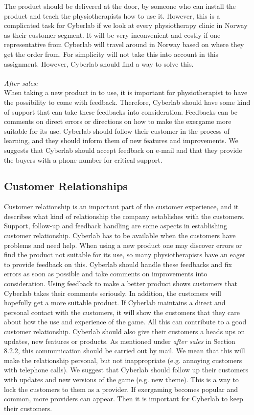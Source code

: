 The product should be delivered at the door, by someone who can install the product and teach the physiotherapists how to use it. However, this is a complicated task for Cyberlab if we look at every physiotherapy clinic in Norway as their customer segment. It will be very inconvenient and costly if  one representative from Cyberlab will travel around in Norway based on where they get the order from. For simplicity will not take this into account in this assignment. However, Cyberlab should find a way to solve this. \\ \\
\emph{After sales:}\\
When taking a new product in to use, it is important for physiotherapist to have the possibility to come with feedback. Therefore, Cyberlab should have some kind of support that can take these feedbacks into consideration. Feedbacks can be comments on direct errors or directions on how to make the exergame more suitable for its use. Cyberlab should follow their customer in the process of learning, and they should inform them of new features and improvements. We suggests that Cyberlab should accept feedback on e-mail and that they provide the buyers with a phone number for critical support.  
\subsection{Customer Relationships}
Customer relationship is an important part of the customer experience, and it describes what kind of relationship the company establishes with the customers. Support, follow-up and feedback handling are some aspects in establishing customer relationship. Cyberlab has to be available when the customers have problems and need help. When using a new product one may discover errors or find the product not suitable for its use, so many physiotherapists have an eager to provide feedback on this. Cyberlab should handle these feedbacks and fix errors as soon as possible and take comments on improvements into consideration. Using feedback to make a better product shows customers that Cyberlab takes their comments seriously.  In addition, the customers will hopefully get a more suitable product.  If Cyberlab maintains a direct and personal contact with the customers, it will show the customers that they care about how the use and experience of the game.  All this can contribute to a good customer relationship. Cyberlab should also give their customers a heads ups on updates, new features or products. As mentioned under \emph{after sales} in Section 8.2.2, this communication should be carried out by mail. We mean that this will make the relationship personal, but not inappropriate (e.g. annoying customers with telephone calls). We suggest that Cyberlab should follow up their customers with updates and new versions of the game (e.g. new theme). This is a way to lock the customers to them as a provider. If exergaming becomes popular and common, more providers can appear. Then it is important for Cyberlab to keep their customers. 
